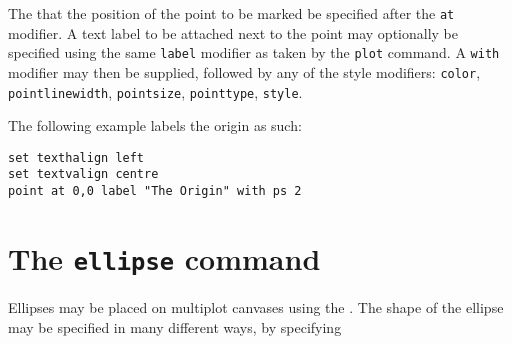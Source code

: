 The  that the position of the point to be marked be specified
after the {\tt at} modifier. A text label to be attached next to the point may
optionally be specified using the same {\tt label} modifier as taken by the
{\tt plot} command. A {\tt with} modifier may then be supplied, followed by any
of the style modifiers: {\tt color}, {\tt pointlinewidth}, {\tt pointsize},
{\tt pointtype}, {\tt style}.

The following example labels the origin as such:
\begin{verbatim}
set texthalign left
set textvalign centre
point at 0,0 label "The Origin" with ps 2
\end{verbatim}

\section{The {\tt ellipse} command}
\label{sec:ellipse}

Ellipses may be placed on multiplot canvases using the . The
shape of the ellipse may be specified in many different ways, by specifying

